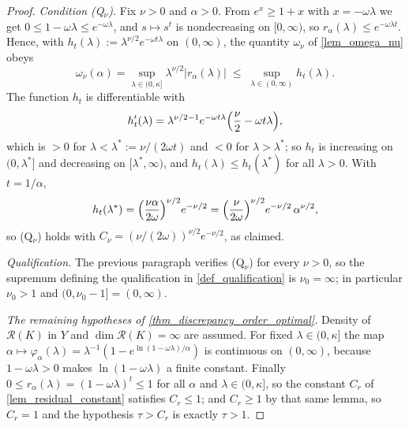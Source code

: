 \documentclass[a4paper]{report}
\theoremstyle{plain}
\theoremstyle{definition}
\theoremstyle{remark}
\newcommand{\Ran}{\mathcal{R}}
\begin{document}
\begin{proof}
  \emph{Condition (Q$_{\nu}$).}  Fix $\nu > 0$ and $\alpha > 0$.  From $e^{x} \ge 1+x$
  with $x = -\omega\lambda$ we get $0 \le 1 - \omega\lambda \le e^{-\omega\lambda}$, and
  $s \mapsto s^{t}$ is nondecreasing on $[0,\infty)$, so
  $r_{\alpha}(\lambda) \le e^{-\omega\lambda t}$.  Hence, with
  $h_{t}(\lambda) := \lambda^{\nu/2}e^{-\omega t\lambda}$ on $(0,\infty)$, the
  quantity $\omega_{\nu}$ of \cref{lem_omega_nu} obeys
  \[
    \omega_{\nu}(\alpha) = \sup_{\lambda \in (0,\kappa]}
      \lambda^{\nu/2}|r_{\alpha}(\lambda)|
      \;\le\; \sup_{\lambda \in (0,\infty)} h_{t}(\lambda) .
  \]
  The function $h_{t}$ is differentiable with
  \[
    h_{t}'(\lambda) = \lambda^{\nu/2-1}e^{-\omega t\lambda}
      \Bigl(\frac{\nu}{2} - \omega t\lambda\Bigr) ,
  \]
  which is $> 0$ for $\lambda < \lambda^{*} := \nu/(2\omega t)$ and $< 0$ for
  $\lambda > \lambda^{*}$; so $h_{t}$ is increasing on $(0,\lambda^{*}]$ and decreasing on
  $[\lambda^{*},\infty)$, and $h_{t}(\lambda) \le h_{t}(\lambda^{*})$ for all
  $\lambda > 0$.  With $t = 1/\alpha$,
  \[
    h_{t}(\lambda^{*}) = \Bigl(\frac{\nu\alpha}{2\omega}\Bigr)^{\nu/2}e^{-\nu/2}
      = \Bigl(\frac{\nu}{2\omega}\Bigr)^{\nu/2}e^{-\nu/2}\,\alpha^{\nu/2} ,
  \]
  so (Q$_{\nu}$) holds with $C_{\nu} = (\nu/(2\omega))^{\nu/2}e^{-\nu/2}$, as claimed.

  \emph{Qualification.}  The previous paragraph verifies (Q$_{\nu}$) for every
  $\nu > 0$, so the supremum defining the qualification in \cref{def_qualification} is
  $\nu_0 = \infty$; in particular $\nu_0 > 1$ and $(0,\nu_0 - 1] = (0,\infty)$.

  \emph{The remaining hypotheses of \cref{thm_discrepancy_order_optimal}.}  Density of
  $\Ran(K)$ in $Y$ and $\dim\Ran(K) = \infty$ are assumed.  For fixed
  $\lambda \in (0,\kappa]$ the map $\alpha \mapsto \varphi_{\alpha}(\lambda) =
  \lambda^{-1}(1 - e^{\ln(1-\omega\lambda)/\alpha})$ is continuous on $(0,\infty)$,
  because $1 - \omega\lambda > 0$ makes $\ln(1-\omega\lambda)$ a finite constant.
  Finally $0 \le r_{\alpha}(\lambda) = (1-\omega\lambda)^{t} \le 1$ for all $\alpha$ and
  $\lambda \in (0,\kappa]$, so the constant $C_r$ of \cref{lem_residual_constant}
  satisfies $C_r \le 1$; and $C_r \ge 1$ by that same lemma, so $C_r = 1$ and the
  hypothesis $\tau > C_r$ is exactly $\tau > 1$.


\end{proof}
\end{document}
